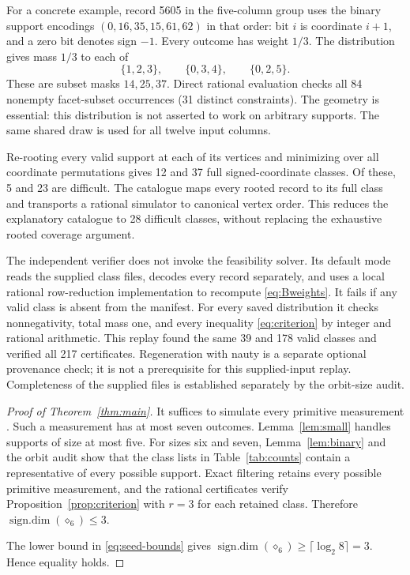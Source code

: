 \documentclass[11pt]{article}
\newcommand{\sdim}{\operatorname{sign.dim}}
\begin{document}
For a concrete example, record 5605 in the five-column group uses the binary
support encodings $(0,16,35,15,61,62)$ in that order: bit $i$ is coordinate
$i+1$, and a zero bit denotes sign $-1$. Every outcome has weight $1/3$.
The distribution gives mass $1/3$ to each of
\[
 \{1,2,3\},\qquad\{0,3,4\},\qquad\{0,2,5\}.
\]
These are subset masks $14,25,37$. Direct rational evaluation checks all
84 nonempty facet-subset occurrences (31 distinct constraints). The geometry
is essential: this distribution is not asserted to work on arbitrary supports.
The same shared draw is used for all twelve input columns.

Re-rooting every valid support at each of its vertices and minimizing over
all coordinate permutations gives 12 and 37 full signed-coordinate classes.
Of these, 5 and 23 are difficult. The catalogue maps every rooted record to
its full class and transports a rational simulator to canonical vertex order.
This reduces the explanatory catalogue to 28 difficult classes, without
replacing the exhaustive rooted coverage argument.

The independent verifier does not invoke the feasibility solver. Its default
mode reads the supplied class files, decodes every record separately, and uses a
local rational row-reduction implementation to recompute
\eqref{eq:Bweights}. It fails if any valid class is absent from the manifest.
For every saved distribution it checks nonnegativity, total mass one, and
every inequality \eqref{eq:criterion} by integer and rational arithmetic.
This replay found the same 39 and 178 valid classes and verified all 217
certificates. Regeneration with nauty is a separate optional provenance check;
it is not a prerequisite for this supplied-input replay. Completeness of the
supplied files is established separately by the orbit-size audit.

\begin{proof}[Proof of Theorem~\ref{thm:main}]
It suffices to simulate every primitive measurement
\cite{DallArnoTosiniBuscemi,BenczeFrenkel}. Such a measurement has at most
seven outcomes. Lemma~\ref{lem:small} handles supports of size at most five.
For sizes six and seven, Lemma~\ref{lem:binary} and the orbit audit show that
the class lists in Table~\ref{tab:counts} contain a representative of every
possible support. Exact filtering retains every possible primitive
measurement, and the rational certificates verify
Proposition~\ref{prop:criterion} with $r=3$ for each retained class.
Therefore $\sdim(\diamond_6)\leq3$.

The lower bound in \eqref{eq:seed-bounds} gives
$\sdim(\diamond_6)\geq\lceil\log_2 8\rceil=3$. Hence equality holds.
\end{proof}
\end{document}
